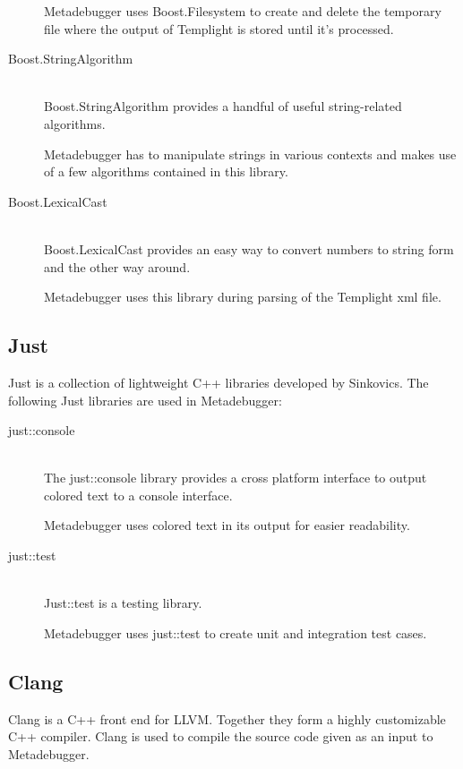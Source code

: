 \begin{description}
        Metadebugger uses Boost.Filesystem to create and delete the temporary
        file where the output of Templight is stored until it's processed.
    \item[Boost.StringAlgorithm]\cite{boost-string} \hfill \\
        Boost.StringAlgorithm provides a handful of useful string-related
        algorithms.

        Metadebugger has to manipulate strings in various contexts and makes
        use of a few algorithms contained in this library.
    \item[Boost.LexicalCast]\cite{boost-lexicalcast} \hfill \\
        Boost.LexicalCast provides an easy way to convert numbers to string
        form and the other way around.

        Metadebugger uses this library during parsing of the Templight xml
        file.

\end{description}

\subsection{Just}

Just\cite{just} is a collection of lightweight C++ libraries developed by
Sinkovics. The following Just libraries are used in Metadebugger:
\begin{description}
    \item[just::console] \hfill \\
        The just::console library provides a cross platform interface to output
        colored text to a console interface.

        Metadebugger uses colored text in its output for easier readability.
    \item[just::test] \hfill \\
        Just::test is a testing library.

        Metadebugger uses just::test to create unit and integration test cases.
\end{description}

\subsection{Clang}

Clang\cite{clang,libclang} is a C++ front end for LLVM. Together they form a
highly customizable C++ compiler. Clang is used to compile the source code
given as an input to Metadebugger.

